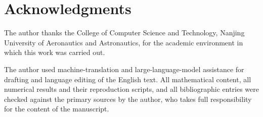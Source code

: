 \documentclass[review,hidelinks,oneeqnum,onetabnum,onefignum,onethmnum]{siamart251216}
\begin{document}
\section*{Acknowledgments}
The author thanks the College of Computer Science and Technology, Nanjing
University of Aeronautics and Astronautics, for the academic environment in
which this work was carried out.

The author used machine-translation and large-language-model assistance for
drafting and language editing of the English text. All mathematical content,
all numerical results and their reproduction scripts, and all bibliographic
entries were checked against the primary sources by the author, who takes full
responsibility for the content of the manuscript.


{\small}
\end{document}
